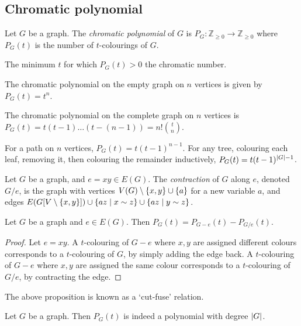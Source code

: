 \subsection{Chromatic polynomial}
\begin{definition}
	Let \( G \) be a graph.
	The \emph{chromatic polynomial} of \( G \) is \( P_G \colon \mathbb Z_{\geq 0} \to \mathbb Z_{\geq 0} \) where \( P_G(t) \) is the number of \( t \)-colourings of \( G \).
\end{definition}
\begin{remark}
	The minimum \( t \) for which \( P_G(t) > 0 \) the chromatic number.
\end{remark}
\begin{example}
	The chromatic polynomial on the empty graph on \( n \) vertices is given by \( P_G(t) = t^n \).

	The chromatic polynomial on the complete graph on \( n \) vertices is \( P_G(t) = t(t-1)\dots(t-(n-1)) = n! \binom t n \).

	For a path on \( n \) vertices, \( P_G(t) = t(t-1)^{n-1} \).
	For any tree, colouring each leaf, removing it, then colouring the remainder inductively, \( P_G(t) = t(t-1)^{\abs{G} - 1} \).
\end{example}
\begin{definition}
	Let \( G \) be a graph, and \( e = xy \in E(G) \).
	The \emph{contraction} of \( G \) along \( e \), denoted \( G / e \), is the graph with vertices \( V(G) \setminus \qty{x, y} \cup \qty{a} \) for a new variable \( a \), and edges \( E(G[V\setminus\qty{x,y}]) \cup \qty{az \mid x \sim z} \cup \qty{az \mid y \sim z} \).
\end{definition}
\begin{proposition}
	Let \( G \) be a graph and \( e \in E(G) \).
	Then \( P_G(t) = P_{G - e}(t) - P_{G/e}(t) \).
\end{proposition}
\begin{proof}
	Let \( e = xy \).
	A \( t \)-colouring of \( G - e \) where \( x, y \) are assigned different colours corresponds to a \( t \)-colouring of \( G \), by simply adding the edge back.
	A \( t \)-colouring of \( G - e \) where \( x, y \) are assigned the same colour corresponds to a \( t \)-colouring of \( G / e \), by contracting the edge.
\end{proof}
\begin{remark}
	The above proposition is known as a `cut-fuse' relation.
\end{remark}
\begin{proposition}
	Let \( G \) be a graph.
	Then \( P_G(t) \) is indeed a polynomial with degree \( \abs{G} \).
\end{proposition}
